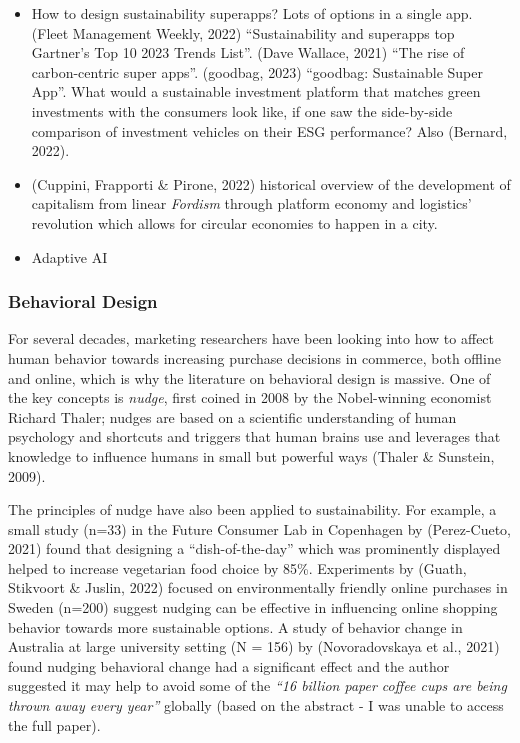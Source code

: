 \documentclass[
  letterpaper,
  DIV=11,
  numbers=noendperiod]{scrartcl}
\begin{document}
\begin{itemize}
\item
  How to design sustainability superapps? Lots of options in a single
  app. (Fleet Management Weekly, 2022) ``Sustainability and superapps
  top Gartner's Top 10 2023 Trends List''. (Dave Wallace, 2021) ``The
  rise of carbon-centric super apps''. (goodbag, 2023) ``goodbag:
  Sustainable Super App''. What would a sustainable investment platform
  that matches green investments with the consumers look like, if one
  saw the side-by-side comparison of investment vehicles on their ESG
  performance? Also (Bernard, 2022).
\item
  (Cuppini, Frapporti \& Pirone, 2022) historical overview of the
  development of capitalism from linear \emph{Fordism} through platform
  economy and logistics' revolution which allows for circular economies
  to happen in a city.
\item
  Adaptive AI
\end{itemize}

\subsubsection{Behavioral Design}\label{behavioral-design}

For several decades, marketing researchers have been looking into how to
affect human behavior towards increasing purchase decisions in commerce,
both offline and online, which is why the literature on behavioral
design is massive. One of the key concepts is \emph{nudge}, first coined
in 2008 by the Nobel-winning economist Richard Thaler; nudges are based
on a scientific understanding of human psychology and shortcuts and
triggers that human brains use and leverages that knowledge to influence
humans in small but powerful ways (Thaler \& Sunstein, 2009).

The principles of nudge have also been applied to sustainability. For
example, a small study (n=33) in the Future Consumer Lab in Copenhagen
by (Perez-Cueto, 2021) found that designing a ``dish-of-the-day'' which
was prominently displayed helped to increase vegetarian food choice by
85\%. Experiments by (Guath, Stikvoort \& Juslin, 2022) focused on
environmentally friendly online purchases in Sweden (n=200) suggest
nudging can be effective in influencing online shopping behavior towards
more sustainable options. A study of behavior change in Australia at
large university setting (N = 156) by (Novoradovskaya et al., 2021)
found nudging behavioral change had a significant effect and the author
suggested it may help to avoid some of the \emph{``16 billion paper
coffee cups are being thrown away every year''} globally (based on the
abstract - I was unable to access the full paper).
\end{document}
